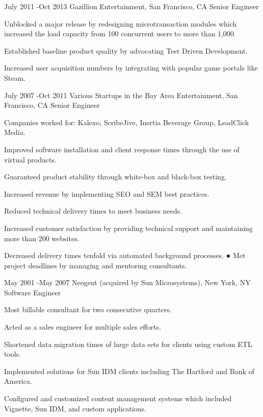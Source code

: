 \documentclass[10pt]{article} %
\begin{document}
\job
{July 2011 -}{Oct 2013}
{Gazillion Entertainment, San Francisco, CA}
{}
{Senior Engineer}
{
\begin{itemize-noindent}

\item{Unblocked a major release by redesigning microtransaction modules which increased the load capacity from 100 concurrent users to more than 1,000.}
\item{Established baseline product quality by advocating Test Driven Development.}
\item{Increased user acquisition numbers by integrating with popular game portals like Steam.} 
\end{itemize-noindent}
}


\job
{July 2007 -}{Oct 2011}
{Various Startups in the Bay Area Entertainment, San Francisco, CA}
{}
{Senior Engineer}
{
\begin{itemize-noindent}

\item{Companies worked for: Kalexo, ScribeJive, Inertia Beverage Group, LeadClick Media.} 
\item{Improved software installation and client response times through the use of virtual products.}
\item{Guaranteed product stability through white-box and black-box testing.}
\item{Increased revenue by implementing SEO and SEM best practices.}
\item{Reduced technical delivery times to meet business needs.} 
\item{Increased customer satisfaction by providing technical support and maintaining more than 200 websites.}
\item{Decreased delivery times tenfold via automated background processes. ● Met project deadlines by managing and mentoring consultants.}

\end{itemize-noindent}
}


\job
{May 2001 -}{May 2007}
{Neogent (acquired by Sun Microsystems), New York, NY}
{}
{Software Engineer}
{
\begin{itemize-noindent}
\item{Most billable consultant for two consecutive quarters.} 
\item{Acted as a sales engineer for multiple sales efforts.} 
\item{Shortened data migration times of large data sets for clients using custom ETL tools.} 
\item{Implemented solutions for Sun IDM clients including The Hartford and Bank of America.} 
\item{Configured and customized content management systems which included Vignette, Sun IDM, and custom applications.} 
\end{itemize-noindent}
}
\end{document}
